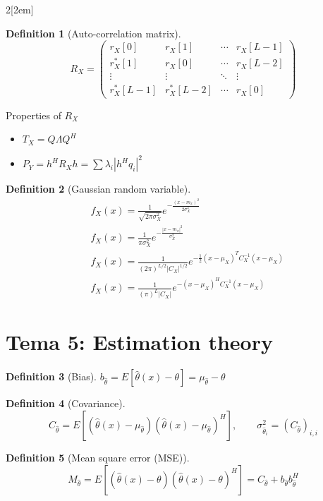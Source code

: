 \documentclass{myclass}
\newtheorem*{definition}{Definition}
\begin{document}
\begin{multicols}{2}[\columnsep2em]
\begin{definition}[Auto-correlation matrix]
\[
  R_X=  \begin{pmatrix} r_X[0] & r_X[1] & \cdots & r_X[L-1] \\
	r^*_X[1] & r_X[0] & \cdots & r_X[L-2] \\
	\vdots & \vdots & \ddots & \vdots \\
	r^*_X[L-1] & r_X^*[L-2] & \cdots & r_X[0]
\end{pmatrix} 
\] 
\end{definition}

Properties of $R_X$
 \begin{itemize}[topsep=-6pt, itemsep=0pt]
  \item $T_X = Q\Lambda Q^H$
  \item  $P_Y=h^HR_Xh = \sum \lambda_i|h^Hq_i|^2$
\end{itemize}

\begin{definition}[Gaussian random variable]
\begin{align*}
  &f_X(x)=\frac{1}{\sqrt{2\pi\sigma _X^2}} e^{-\frac{(x-m_x)^2}{2\sigma ^2_{X}}}\\
  &f_X(x)=\frac{1}{\pi\sigma _X^2} e^{-\frac{|x-m_x|^2}{\sigma ^2_{X}}} \\
  &f_X(x)=\frac{1}{(2\pi)^{L /2}|C_X|^{1 /2}} e^{-\frac{1}{2}(x-\mu_X)^TC_X^{-1}(x-\mu_X)}\\
  &f_X(x)=\frac{1}{(\pi)^{L}|C_X|} e^{-(x-\mu_X)^HC_X^{-1}(x-\mu_X)}
\end{align*}
\end{definition}

\section{Tema 5: Estimation theory}

\begin{definition}[Bias] $b_{\hat{\theta}} = E[\hat{\theta} (x)-\theta ] = \mu_{\hat{\theta }} -\theta $
\end{definition}

\begin{definition}[Covariance] 
  \[
    C_{\hat{\theta }} = E[(\hat{\theta }(x)-\mu_{\hat{\theta }})(\hat{\theta }(x)-\mu_{\hat{\theta }})^H], \qquad \sigma_{\hat{\theta}_i}^2 = (C_{\hat{\theta }})_{i,i}
  \] 
\end{definition}

\begin{definition}[Mean square error (MSE)]
  \[
    M_{\hat{\theta }} = E[(\hat{\theta }(x)-\theta )(\hat{\theta }(x)-\theta )^H] = C_{\hat{\theta }} + b_{\hat{\theta }}b_{\hat{\theta }}^H
  \] 
\end{definition}


\end{multicols}
\end{document}
